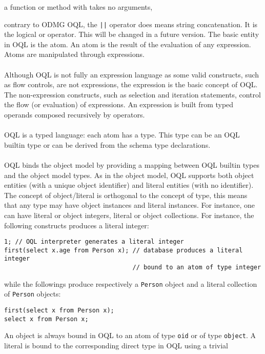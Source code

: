 a function or method with takes no arguments,
\item contrary to ODMG OQL, the \texttt{||} operator does means string
concatenation. It is the logical or operator. This will be changed
in a future version.
\ee
{}
\label{lconcepts}
The basic entity in OQL is the atom. An atom is the result of the
evaluation of any expression. Atoms are manipulated through expressions.
\\
\\
Although OQL is not fully an expression language as some valid constructs, such
as flow controls, are not expressions, the expression is the basic
concept of OQL.
The non-expression constructs, such as selection and iteration statements,
control the flow (or evaluation) of expressions.
An expression is built from typed operands composed recursively by operators.
\\
\\
OQL is a typed language: each atom has a type. This type
can be an OQL builtin type or can be derived from the schema type
declarations.
\\
\\
OQL binds the \eyedb object model by providing a mapping between OQL builtin
types and the \eyedb object model types. As in the \eyedb object model,
OQL supports both object entities (with a unique object identifier)
and literal entities (with no identifier).
The concept of object/literal is orthogonal to the concept of type, this
means that any type may have object instances and literal instances.
For instance, one can have literal or object integers, literal or
object collections.
For instance, the following constructs produces a literal integer:
\verbsize
\begin{verbatim}
1; // OQL interpreter generates a literal integer
first(select x.age from Person x); // database produces a literal integer
                                   // bound to an atom of type integer
\end{verbatim}
\normalsize
while the followings produce respectively a \texttt{Person} object and
a literal collection of \texttt{Person} objects:
\verbsize
\begin{verbatim}
first(select x from Person x);
select x from Person x;
\end{verbatim}
\normalsize
An \eyedb object is always bound
in OQL to an atom of type \texttt{oid} or of type \texttt{object}.
A literal is bound to the corresponding direct type in OQL using a trivial
